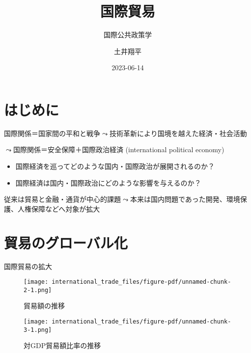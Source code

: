 \documentclass[
  xelatex,
  ja=standard]{bxjsarticle}
\title{国際貿易}
\subtitle{国際公共政策学}
\author{土井翔平}
\date{2023-06-14}
\providecommand{\tightlist}{%
  \setlength{\itemsep}{0pt}\setlength{\parskip}{0pt}}\usepackage{longtable,booktabs,array}
\begin{document}
\maketitle
\ifdefined\Shaded\renewenvironment{Shaded}{\begin{tcolorbox}[frame hidden, boxrule=0pt, interior hidden, enhanced, sharp corners, borderline west={3pt}{0pt}{shadecolor}, breakable]}{\end{tcolorbox}}\fi

\hypertarget{ux306fux3058ux3081ux306b}{%
\section*{はじめに}\label{ux306fux3058ux3081ux306b}}

国際関係＝国家間の平和と戦争\(\leadsto\)技術革新により国境を越えた経済・社会活動

\(\leadsto\)国際関係＝安全保障＋国際政治経済 (international political
economy)

\begin{itemize}
\tightlist
\item
  国際経済を巡ってどのような国内・国際政治が展開されるのか？
\item
  国際経済は国内・国際政治にどのような影響を与えるのか？
\end{itemize}

従来は貿易と金融・通貨が中心的課題\(\leadsto\)本来は国内問題であった開発、環境保護、人権保障などへ対象が拡大

\hypertarget{ux8cbfux6613ux306eux30b0ux30edux30fcux30d0ux30ebux5316}{%
\section{貿易のグローバル化}\label{ux8cbfux6613ux306eux30b0ux30edux30fcux30d0ux30ebux5316}}

国際貿易の拡大

\begin{figure}[htpb]

{\centering \texttt{[image: international\_trade\_files/figure-pdf/unnamed-chunk-2-1.png]}

}

\caption{貿易額の推移}

\end{figure}

\begin{figure}[htpb]

{\centering \texttt{[image: international\_trade\_files/figure-pdf/unnamed-chunk-3-1.png]}

}

\caption{対GDP貿易額比率の推移}

\end{figure}
\end{document}

